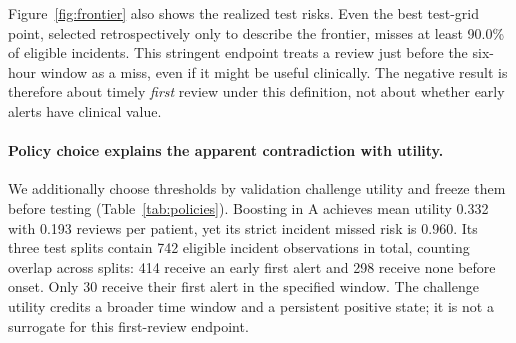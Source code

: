 Figure~\ref{fig:frontier} also shows the realized test risks. Even the best test-grid point, selected retrospectively only to describe the frontier, misses at least 90.0\% of eligible incidents. This stringent endpoint treats a review just before the six-hour window as a miss, even if it might be useful clinically. The negative result is therefore about timely \emph{first} review under this definition, not about whether early alerts have clinical value.

\paragraph{Policy choice explains the apparent contradiction with utility.}
We additionally choose thresholds by validation challenge utility and freeze them before testing (Table~\ref{tab:policies}). Boosting in A achieves mean utility 0.332 with 0.193 reviews per patient, yet its strict incident missed risk is 0.960. Its three test splits contain 742 eligible incident observations in total, counting overlap across splits: 414 receive an early first alert and 298 receive none before onset. Only 30 receive their first alert in the specified window. The challenge utility credits a broader time window and a persistent positive state; it is not a surrogate for this first-review endpoint.

